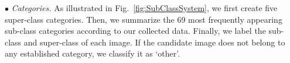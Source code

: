 \documentclass[10pt,journal,compsoc]{IEEEtran}
\def\eg{\emph{e.g.}}
\newcommand{\figref}[1]{Fig.~\ref{#1}}
\newcommand{\fdp}[1]{\textbf{\textcolor{red}{#1}}}
\begin{document}


$\bullet$ \emph{Categories.}
As illustrated in \figref{fig:SubClassSystem}, 
we first create five super-class categories.
Then, we summarize the 69 most frequently appearing sub-class categories 
according to our collected data.
Finally, we label the sub-class and super-class of each image.
If the candidate image does not belong to any established category,
we classify it as `other'.
\end{document}
